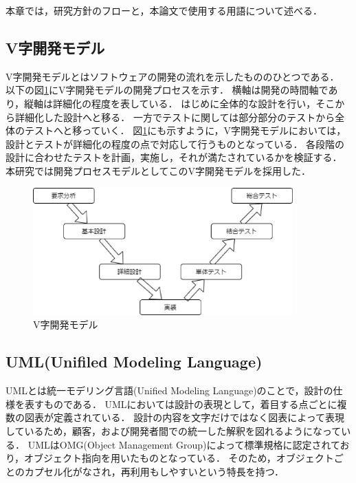 

本章では，研究方針のフローと，本論文で使用する用語について述べる．

\subsection*{V字開発モデル}

V字開発モデルとはソフトウェアの開発の流れを示したもののひとつである．
以下の図\ref{vji}にV字開発モデルの開発プロセスを示す．
横軸は開発の時間軸であり，縦軸は詳細化の程度を表している\cite{kumikomi}．
はじめに全体的な設計を行い，そこから詳細化した設計へと移る．
一方でテストに関しては部分部分のテストから全体のテストへと移っていく．
図\ref{vji}にも示すように，V字開発モデルにおいては，設計とテストが詳細化の程度の点で対応して行うものとなっている．
各段階の設計に合わせたテストを計画，実施し，それが満たされているかを検証する．
本研究では開発プロセスモデルとしてこのV字開発モデルを採用した．

\begin{figure}[htbp]
\centering
\includegraphics[width=10cm]{./picture/vjimodel.eps}
\caption{V字開発モデル}
\label{vji}
\end{figure}


\subsection*{UML(Unifiled Modeling Language)}

UMLとは統一モデリング言語(Unified Modeling Language)のことで，設計の仕様を表すものである\cite{uml}．
UMLにおいては設計の表現として，着目する点ごとに複数の図表が定義されている．
設計の内容を文字だけではなく図表によって表現しているため，顧客，および開発者間での統一した解釈を図れるようになっている．
UMLはOMG(Object Management Group)によって標準規格に認定されており，オブジェクト指向を用いたものとなっている\cite{uml}．
そのため，オブジェクトごとのカプセル化がなされ，再利用もしやすいという特長を持つ．

